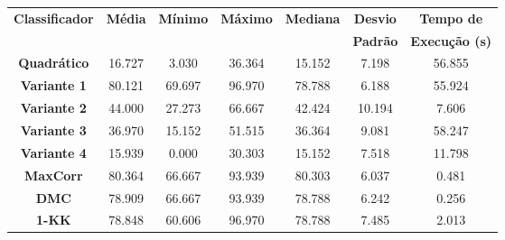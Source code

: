 \begin{tabular}{|c|c|c|c|c|c|c|}%
\hline%
\multirow{2}{*}{\textbf{Classificador}}&\multirow{2}{*}{\textbf{Média}}&\multirow{2}{*}{\textbf{Mínimo}}&\multirow{2}{*}{\textbf{Máximo}}&\multirow{2}{*}{\textbf{Mediana}}&\textbf{Desvio}&\textbf{Tempo de}\\%
&&&&&\textbf{Padrão}&\textbf{Execução (s)}\\%
\hline%
\hline%
\textbf{Quadrático}&16.727&3.030&36.364&15.152&7.198&56.855\\%
\hline%
\textbf{Variante 1}&80.121&69.697&96.970&78.788&6.188&55.924\\%
\hline%
\textbf{Variante 2}&44.000&27.273&66.667&42.424&10.194&7.606\\%
\hline%
\textbf{Variante 3}&36.970&15.152&51.515&36.364&9.081&58.247\\%
\hline%
\textbf{Variante 4}&15.939&0.000&30.303&15.152&7.518&11.798\\%
\hline%
\textbf{MaxCorr}&80.364&66.667&93.939&80.303&6.037&0.481\\%
\hline%
\textbf{DMC}&78.909&66.667&93.939&78.788&6.242&0.256\\%
\hline%
\textbf{1{-}KK}&78.848&60.606&96.970&78.788&7.485&2.013\\%
\hline%
\hline%
\end{tabular}